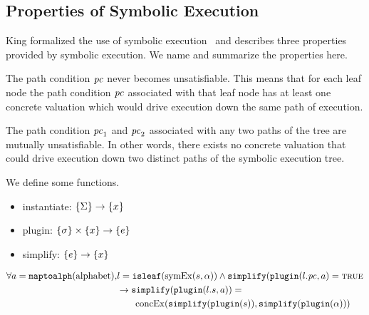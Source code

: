 
\subsection{Properties of Symbolic Execution}
King formalized the use of symbolic execution~\cite{king1976symbolic} and describes three
properties provided by symbolic execution. We name and summarize the properties
here.
\begin{property}
  \label{prop:kingsound}
  The path condition $\mathit{pc}$ never becomes unsatisfiable. This means that for each
  leaf node the path condition $\mathit{pc}$ associated with that leaf node has at
  least one concrete valuation which would drive execution down the same path of
  execution.
\end{property}
\begin{property}
  \label{prop:kingunique}
The path condition $\mathit{pc}_1$ and $\mathit{pc}_2$ associated with any two paths of the
tree are mutually unsatisfiable. In other words, there exists no concrete
valuation that could drive execution down two distinct paths of the symbolic
execution tree.
\end{property}
\begin{property}[Commutativity]
  We define some functions.
  \begin{itemize}
  \item instantiate: $\{\Sigma\} \rightarrow \{x\}$
  \item plugin: $\{\sigma\} \times \{x\} \rightarrow
    \{e\}$
  \item simplify: $\{e\} \rightarrow \{x\}$
  \end{itemize}
  
\begin{align*}
\forall a = \mathtt{maptoalph}(\mathrm{alphabet}), & l =
\mathtt{isleaf}(\mathrm{symEx}(s,\alpha)) \wedge
\mathtt{simplify}(\mathtt{plugin}(l.\mathit{pc},a) = \mathtt{\textsc{true}} \\
&\rightarrow \mathtt{simplify}(\mathtt{plugin}(l.s,a)) = \\
&\qquad\mathrm{concEx}(\mathtt{simplify}(\mathtt{plugin}(s)),\mathtt{simplify}(\mathtt{plugin}(\alpha)))
\end{align*}
\end{property}

